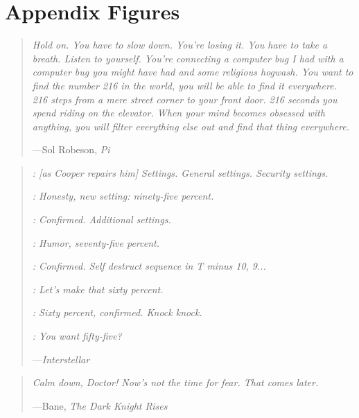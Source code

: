\chapter{Appendix Figures}

\begin{quote}
  \emph{Hold on. You have to slow down. You're losing it. You have to take a breath. Listen to yourself. You're connecting a computer bug I had with a computer bug you might have had and some religious hogwash. You want to find the number 216 in the world, you will be able to find it everywhere. 216 steps from a mere street corner to your front door. 216 seconds you spend riding on the elevator. When your mind becomes obsessed with anything, you will filter everything else out and find that thing everywhere.}
  
  \begin{flushright}
    —Sol Robeson, \emph{Pi}
  \end{flushright}
\end{quote}

\vspace{1em}

\begin{quote}
  \emph{: \emph{[as Cooper repairs him]} Settings. General settings. Security settings.}
  
  \emph{: Honesty, new setting: ninety-five percent.}
  
  \emph{: Confirmed. Additional settings.}
  
  \emph{: Humor, seventy-five percent.}
  
  \emph{: Confirmed. Self destruct sequence in T minus 10, 9...}
  
  \emph{: Let's make that sixty percent.}
  
  \emph{: Sixty percent, confirmed. Knock knock.}
  
  \emph{: You want fifty-five?}
  
  \begin{flushright}
    —\emph{Interstellar}
  \end{flushright}
\end{quote}

\vspace{1em}

\begin{quote}
  \emph{Calm down, Doctor! Now's not the time for fear. That comes later.}
  
  \begin{flushright}
    —Bane, \emph{The Dark Knight Rises}
  \end{flushright}
\end{quote}

